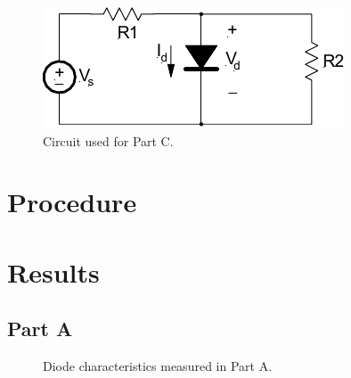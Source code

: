 \documentclass{article}
\begin{document}
\begin{figure}[hbtp]
  \begin{center}
    \includegraphics[]{img/circuit2}
  \end{center}
  \caption{\label{fig:circuit2} Circuit used for Part C.}
\end{figure}

\section{Procedure}
\label{sec:procedure}

%
%

\section{Results}
\label{sec:results}

\subsection{Part A}
\label{sec:result_a}

\begin{figure}[hbtp]
  \begin{center}
    
  \end{center}
  \caption{\label{fig:part_a_graph} Diode characteristics measured in Part A.}
\end{figure}
\end{document}
